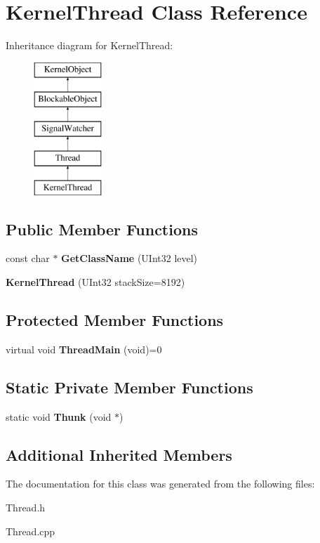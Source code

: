 \hypertarget{class_kernel_thread}{}\section{Kernel\+Thread Class Reference}
\label{class_kernel_thread}
Inheritance diagram for Kernel\+Thread\+:\begin{figure}[H]
\begin{center}
\leavevmode
\includegraphics[height=5.000000cm]{class_kernel_thread}
\end{center}
\end{figure}
\subsection*{Public Member Functions}
\begin{DoxyCompactItemize}
\item 
\mbox{\label{class_kernel_thread_ad9defc2320d37356a6f04aeb9b3ec4ec}} 
const char $\ast$ {\bfseries Get\+Class\+Name} (U\+Int32 level)
\item 
\mbox{\label{class_kernel_thread_a41ad6abfcc539d2d1f4e8c7a10f4878e}} 
{\bfseries Kernel\+Thread} (U\+Int32 stack\+Size=8192)
\end{DoxyCompactItemize}
\subsection*{Protected Member Functions}
\begin{DoxyCompactItemize}
\item 
\mbox{\label{class_kernel_thread_ae7704cf3525422c7a7bb1829cad9824e}} 
virtual void {\bfseries Thread\+Main} (void)=0
\end{DoxyCompactItemize}
\subsection*{Static Private Member Functions}
\begin{DoxyCompactItemize}
\item 
\mbox{\label{class_kernel_thread_ac7df0d5b3175b405112f6959b9e88dc9}} 
static void {\bfseries Thunk} (void $\ast$)
\end{DoxyCompactItemize}
\subsection*{Additional Inherited Members}


The documentation for this class was generated from the following files\+:\begin{DoxyCompactItemize}
\item 
Thread.\+h\item 
Thread.\+cpp\end{DoxyCompactItemize}
